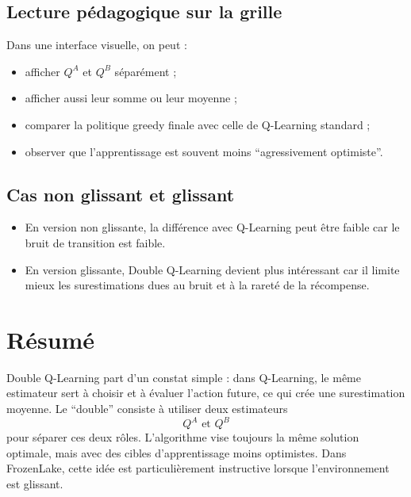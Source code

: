 \documentclass[11pt,a4paper]{article}
\begin{document}
\subsection{Lecture pédagogique sur la grille}

Dans une interface visuelle, on peut :
\begin{itemize}[leftmargin=1.6em]
    \item afficher $Q^A$ et $Q^B$ séparément ;
    \item afficher aussi leur somme ou leur moyenne ;
    \item comparer la politique greedy finale avec celle de Q-Learning standard ;
    \item observer que l'apprentissage est souvent moins ``agressivement optimiste''.
\end{itemize}

\subsection{Cas non glissant et glissant}

\begin{itemize}[leftmargin=1.6em]
    \item En version non glissante, la différence avec Q-Learning peut être faible car le bruit de transition est faible.
    \item En version glissante, Double Q-Learning devient plus intéressant car il limite mieux les surestimations dues au bruit et à la rareté de la récompense.
\end{itemize}

\section{Résumé}

Double Q-Learning part d'un constat simple : dans Q-Learning, le même estimateur sert à choisir et à évaluer l'action future, ce qui crée une surestimation moyenne. Le ``double'' consiste à utiliser deux estimateurs
\[
Q^A \text{ et } Q^B
\]
pour séparer ces deux rôles. L'algorithme vise toujours la même solution optimale, mais avec des cibles d'apprentissage moins optimistes. Dans FrozenLake, cette idée est particulièrement instructive lorsque l'environnement est glissant.
\end{document}
